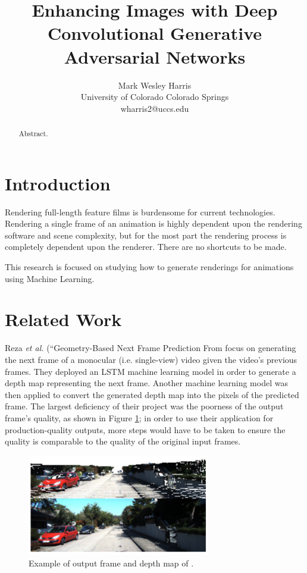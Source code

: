 \documentclass[letterpaper]{article} %
\title{Enhancing Images with Deep Convolutional Generative Adversarial Networks}
\author{Mark Wesley Harris\\ %
University of Colorado Colorado Springs\\
wharris2@uccs.edu %
}
\begin{document}
\maketitle

\begin{abstract}
Abstract.
\end{abstract}

\section{Introduction}
\label{sec:introduction}
Rendering full-length feature films is burdensome for current technologies.
Rendering a single frame of an animation is highly dependent upon the rendering software
and scene complexity,
but for the most part the rendering process is completely dependent upon the renderer.
There are no shortcuts to be made.

This research is focused on studying how to generate renderings for animations using
Machine Learning.

\section{Related Work}
\label{sec:related_work}
Reza \textit{et al.} \cite{ref:frame_prediction} (``Geometry-Based Next Frame Prediction From
focus on generating the
next frame of a monocular (i.e. single-view) video 
given the video's previous frames. They deployed
an LSTM machine learning model in order to generate a depth map representing the next frame.
Another machine learning model was then applied to convert the generated depth
map into the pixels of the predicted frame. The largest deficiency of their
project was the poorness of the output frame's quality, as shown in Figure
\ref{fig:frame_prediction}; in order to use their
application for production-quality outputs, more steps would have
to be taken to ensure the quality is comparable to the quality of the original input frames.

\begin{figure}[htbp]
\centerline{\includegraphics[width=8cm]{frame_prediction.png}}
\caption{Example of output frame and depth map of \cite{ref:frame_prediction}.}
\label{fig:frame_prediction}
\end{figure}
\end{document}
